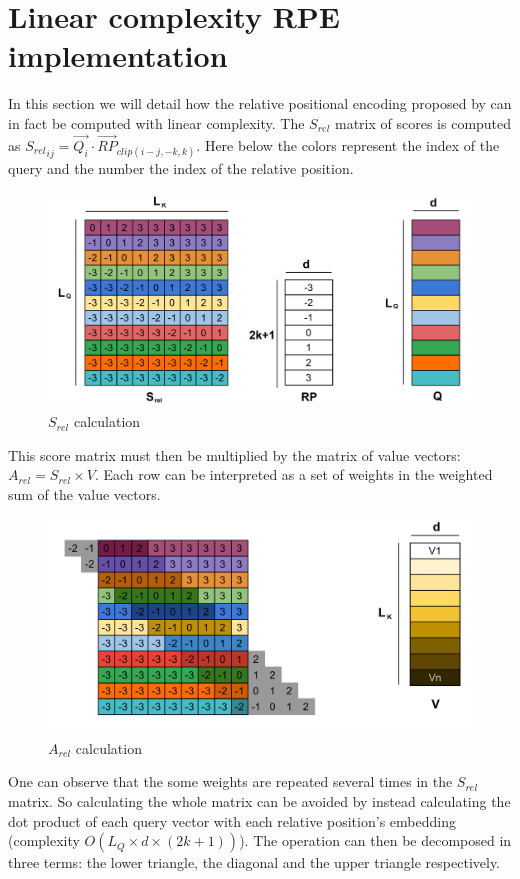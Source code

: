 \section{Linear complexity RPE
implementation}

In this section we will detail how the relative positional encoding
 proposed by \citet{shaw2018selfattention}
can in fact be computed with linear complexity. The $S_{rel}$ matrix of scores is computed as
${S_{rel}}_{ij} = \vec{Q_i} \cdotp \vec{RP}_{clip(i-j, -k, k)}$. Here
below the colors represent the index of the query and the number the
index of the relative position.

\begin{figure}
\centering
\includegraphics[width=0.9\linewidth]{images/S_rel.png}
\caption{$S_{rel}$ calculation}
\end{figure}

This score matrix must then be multiplied by the matrix of value
vectors: $A_{rel} = S_{rel} \times V$. Each row can be interpreted as
a set of weights in the weighted sum of the value vectors.

\begin{figure}
\centering
\includegraphics[width=0.9\linewidth]{images/S_rel_V.png}
\caption{$A_{rel}$ calculation}
\end{figure}

One can observe that the some weights are repeated several times in the
$S_{rel}$ matrix. So calculating the whole matrix can be avoided by
instead calculating the dot product of each query vector with each
relative position's embedding (complexity
$O \left(L_Q\times d\times(2k+1)\right)$). The operation can then be
decomposed in three terms: the lower triangle, the diagonal and the
upper triangle respectively.

